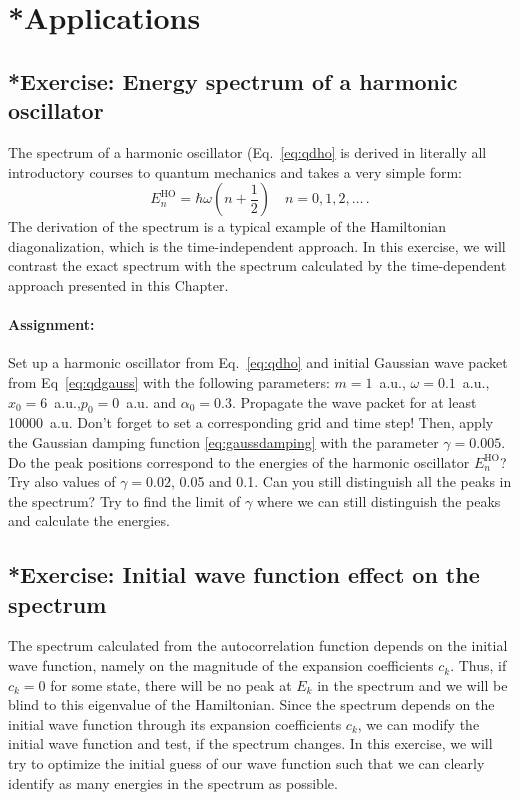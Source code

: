 \section{*Applications}

\subsection*{*Exercise: Energy spectrum of a harmonic oscillator}

The spectrum of a harmonic oscillator (Eq.~\eqref{eq:qdho} is derived in literally all introductory courses to quantum mechanics and takes a very simple form:
\begin{equation*}
    E_n^\mathrm{HO} = \hbar\omega\left(n+\frac{1}{2}\right) \quad n=0,1,2,\dots \, .
\end{equation*}
The derivation of the spectrum is a typical example of the Hamiltonian diagonalization, which is the time-independent approach. In this exercise, we will contrast the exact spectrum with the spectrum calculated by the time-dependent approach presented in this Chapter.

\paragraph{Assignment:} Set up a harmonic oscillator from Eq.~\eqref{eq:qdho} and initial Gaussian wave packet from Eq~\eqref{eq:qdgauss} with the following parameters: $m=1$~a.u., $\omega=0.1$~a.u., $x_0=6$~a.u.,$p_0=0$~a.u. and $\alpha_0 = 0.3$. Propagate the wave packet for at least 10000~a.u. Don't forget to set a corresponding grid and time step! Then, apply the Gaussian damping function \eqref{eq:gaussdamping} with the parameter $\gamma = 0.005$. Do the peak positions correspond to the energies of the harmonic oscillator $E_n^\mathrm{HO}$? Try also values of $\gamma=0.02$, 0.05 and 0.1. Can you still distinguish all the peaks in the spectrum? Try to find the limit of $\gamma$ where we can still distinguish the peaks and calculate the energies. 

\subsection*{*Exercise: Initial wave function effect on the spectrum}

The spectrum calculated from the autocorrelation function depends on the initial wave function, namely on the magnitude of the expansion coefficients $c_k$. Thus, if $c_k = 0$ for some state, there will be no peak at $E_k$ in the spectrum and we will be blind to this eigenvalue of the Hamiltonian. Since the spectrum depends on the initial wave function through its expansion coefficients $c_k$, we can modify the initial wave function and test, if the spectrum changes. In this exercise, we will try to optimize the initial guess of our wave function such that we can clearly identify as many energies in the spectrum as possible. 


